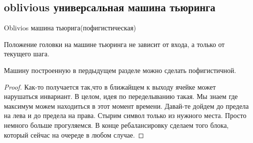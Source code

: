 \subsection{oblivious универсальная машина тьюринга}
\begin{Def}
	Oblivios машина тьюрига(пофигистическая)

	Положение головки на машине тьюринга не зависит от входа, а только от 
	текущего шага. 
\end{Def}
\begin{theorem}
	Машину построенную в пердыдущем разделе можно сделать пофигистичной. 
\end{theorem}
\begin{proof}
	Как-то получается так,что в ближайщем к выходу ячейке может нарушаться
	инвариант. В целом, идея по переделыванию такая. Мы знаем где максимум
	можем находиться в этот момент времени. Давай-те дойдем до предела на лева и
	до предела на права. Стырим символ только из нужного места. Просто немного больше
	прогуляемся. В конце ребалансировку сделаем того блока, который сейчас на очереде
	в любом случае. 	
\end{proof} 
